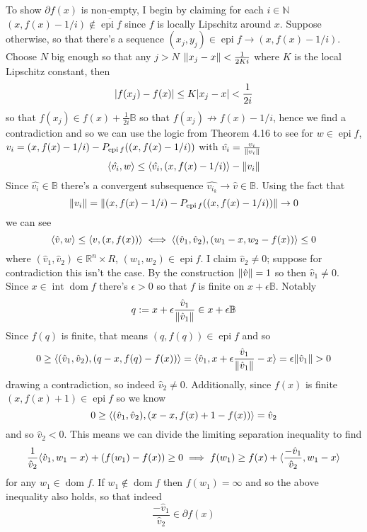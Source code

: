 \documentclass{article}
\newenvironment{ex}[1]
  {\renewcommand\theexercise{#1}\exercise}
  {\endexercise}
\newcommand{\B}{\mathbb{B}}
\DeclareMathOperator*{\dom}{dom}
\DeclareMathOperator*{\inte}{int}
\DeclareMathOperator*{\epi}{epi}
\newcommand{\clo}[1]{\overline{#1}}
\newcommand{\R}[1]{\mathbb{R}^{#1}}
\begin{document}
\begin{ex}{7.20}
\begin{enumerate}[label=(\alph*)]
      To show $\partial f(x)$ is non-empty, I begin by claiming for each $i \in \mathbb{N}$ $(x, f(x) - 1/i) \not\in \clo{\epi f}$ since $f$ is locally Lipschitz around $x$. Suppose otherwise, so that there's a sequence $(x_j, y_j) \in \epi f \to (x, f(x) - 1/i)$. Choose $N$ big enough so that any $j > N$ $\lVert x_j - x\rVert < \frac{1}{2 K i}$ where $K$ is the local Lipschitz constant, then
      $$
      \lvert f(x_j) - f(x)\rvert \le K \lvert x_j - x\rvert < \frac{1}{2i}
      $$
      so that $f(x_j) \in f(x) + \frac{1}{2i} \B$ so that $f(x_j) \not\to f(x) - 1/i$, hence we find a contradiction and so we can use the logic from Theorem 4.16 to see for $w \in \epi f$, $v_i = (x, f(x) - 1/i) - \pp{\epi f}{(x, f(x) - 1/i)}$ with $\hat{v_i} = \frac{v_i}{\lVert v_i\rVert}$
      $$
      \langle\hat{v_i}, w\rangle \le \langle\hat{v_i}, (x, f(x) - 1/i)\rangle - \lVert v_i\rVert
      $$
      Since $\hat{v_i} \in \B$ there's a convergent subsequence $\hat{v_{i_k}} \to \hat{v} \in \B$. Using the fact that
      $$
      \norm{v_i} = \norm{(x, f(x) - 1/i) - \pp{\epi f}{(x, f(x) - 1/i)}} \to 0
      $$
      we can see
      $$
      \langle\hat{v}, w\rangle \le \langle v, (x, f(x))\rangle \iff \langle(\hat{v}_1, \hat{v}_2), (w_1 - x, w_2 - f(x))\rangle \le 0
      $$
      where $(\hat{v}_1, \hat{v}_2) \in \R{n} \times R$, $(w_1, w_2) \in \epi f$. I claim $\hat{v}_2 \ne 0$; suppose for contradiction this isn't the case. By the construction $\lVert\hat{v}\rVert = 1$ so then $\hat{v}_1 \ne 0$. Since $x \in \inte \dom f$ there's $\epsilon > 0$ so that $f$ is finite on $x + \epsilon \B$. Notably
      $$
      q := x + \epsilon \frac{\hat{v}_1}{\norm{\hat{v}_1}} \in x + \epsilon \B
      $$
      Since $f(q)$ is finite, that means $(q, f(q)) \in \epi f$ and so
      $$
      0 \ge \langle(\hat{v}_1, \hat{v}_2), (q - x, f(q) - f(x))\rangle = \langle\hat{v}_1, x + \epsilon \frac{\hat{v}_1}{\lVert\hat{v}_1\rVert} - x\rangle = \epsilon \lVert\hat{v}_1\rVert > 0
      $$
      drawing a contradiction, so indeed $\hat{v}_2 \ne 0$. Additionally, since $f(x)$ is finite $(x, f(x)+1) \in \epi f$ so we know
      $$
      0 \ge \langle(\hat{v}_1, \hat{v}_2), (x-x, f(x) + 1 - f(x))\rangle = \hat{v}_2
      $$
      and so $\hat{v}_2 < 0$. This means we can divide the limiting separation inequality to find
      $$
      \frac{1}{\hat{v}_2}\langle\hat{v}_1, w_1 - x\rangle + (f(w_1) - f(x)) \ge 0 \implies f(w_1) \ge f(x) + \langle\frac{-\hat{v}_1}{\hat{v}_2}, w_1 - x\rangle
      $$
      for any $w_1 \in \dom f$. If $w_1 \not\in \dom f$ then $f(w_1) = \infty$ and so the above inequality also holds, so that indeed
      $$
      \frac{-\hat{v}_1}{\hat{v}_2} \in \partial f(x)
$$
\end{enumerate}
\end{ex}
\end{document}
